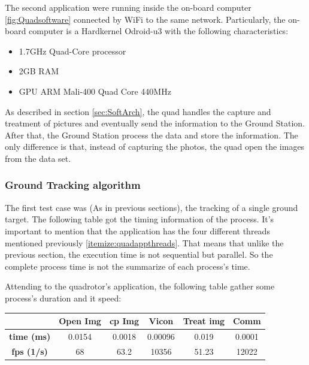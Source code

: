 	The second application were running inside the on-board computer \ref{fig:Quadsoftware} connected by WiFi to the same network. Particularly, the on-board computer is a Hardkernel Odroid-u3 with the following characteristics:
	
	
	\begin{itemize}
		\item 1.7GHz Quad-Core processor 
		\item 2GB RAM
		\item GPU ARM Mali-400 Quad Core 440MHz  
	\end{itemize}
	
	As described in section \ref{sec:SoftArch}, the quad handles the capture and treatment of pictures and eventually send the information to the Ground Station. After that, the Ground Station process the data and store the information. The only difference is that, instead of capturing the photos, the quad open the images from the data set.
	
	
	\subsubsection{Ground Tracking algorithm}
	
	The first test case was (As in previous sections), the tracking of a single ground target. The following table got the timing information of the process. It's important to mention that the application has the four different threads mentioned previously \ref{itemize:quadappthreads}. That means that unlike the previous section, the execution time is not sequential but parallel. So the complete process time is not the summarize of each process's time.
	
	Attending to the quadrotor's application, the following table gather some process's duration and it speed:
	\newline
	\newline
	{
	\centering
		\begin{tabular}{|c|c|c|c|c|c|}
		\hline  					&  Open Img	&  cp Img 	& Vicon 	& Treat img & Comm  		\\ 
		\hline  \textbf{time (ms)}	& 	0.0154	& 0.0018	&	0.00096	&  	 0.019	&	0.0001		\\ 
		\hline  \textbf{fps (1/s)}	&  	68		&  63.2		&  10356	&  	51.23	&	12022		\\ 
		\hline 
		\end{tabular} 
	}
	\newline
	
